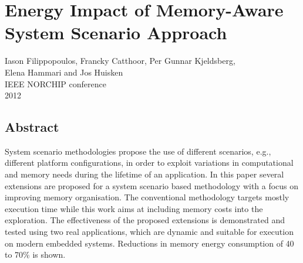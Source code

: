 %
%


\chapter{Energy Impact of Memory-Aware System Scenario Approach}
\label{norchip}

\begin{center}
Iason Filippopoulos, Francky Catthoor, Per Gunnar Kjeldsberg, \\ Elena Hammari and Jos Huisken
\\
IEEE NORCHIP conference
\\
2012
\end{center}
\afterpage{\null\newpage}
\newpage

\vspace*{\fill}
\section*{\hspace*{\fill} Abstract \hspace*{\fill}}
System scenario methodologies propose the use of different scenarios, e.g., different platform configurations, in order to exploit variations in computational and memory needs during the lifetime of an application. In this paper several extensions are proposed for a system scenario based methodology with a focus on improving memory organisation. The conventional methodology targets mostly execution time while this work aims at including memory costs into the exploration. The effectiveness of the proposed extensions is demonstrated and tested using two real applications, which are dynamic and suitable for execution on modern embedded systems. Reductions in memory energy consumption of 40 to 70\% is shown.
\vspace*{\fill}
\afterpage{\null\newpage}
\newpage

